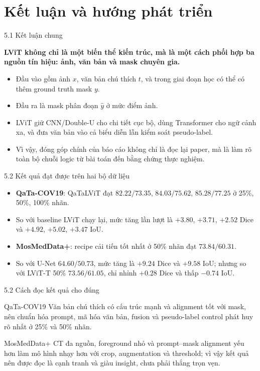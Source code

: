 \documentclass[aspectratio=169,11pt]{beamer}
\newcommand{\reportclaim}[1]{%
  \vspace{0.08cm}
  {\large\bfseries\color{accentblue}#1\par}
  \vspace{0.06cm}
}
\newcommand{\chapterdivider}[2]{%
  \begin{frame}[plain]
    \centering
    \vspace{1.2cm}
    \makebox[\textwidth][c]{%
      \begin{beamercolorbox}[wd=0.84\textwidth,rounded=true,sep=0.42cm,center]{frametitle}
        {\LARGE\bfseries #1\par}
        \vspace{0.20cm}
        {\large #2\par}
      \end{beamercolorbox}%
    }
  \end{frame}
}
\begin{document}
\section{Kết luận và hướng phát triển}
\chapterdivider{Chương 5}{Kết luận và hướng phát triển}

\begin{frame}{5.1 Kết luận chung}
  \reportclaim{LViT không chỉ là một biến thể kiến trúc, mà là một cách phối hợp ba nguồn tín hiệu: ảnh, văn bản và mask chuyên gia.}
  \begin{itemize}
    \item Đầu vào gồm ảnh \(x\), văn bản chú thích \(t\), và trong giai đoạn học có thể có thêm ground truth mask \(y\).
    \item Đầu ra là mask phân đoạn \(\hat{y}\) ở mức điểm ảnh.
    \item LViT giữ CNN/Double-U cho chi tiết cục bộ, dùng Transformer cho ngữ cảnh xa, và đưa văn bản vào cả biểu diễn lẫn kiểm soát pseudo-label.
    \item Vì vậy, đóng góp chính của báo cáo không chỉ là đọc lại paper, mà là làm rõ toàn bộ chuỗi logic từ bài toán đến bằng chứng thực nghiệm.
  \end{itemize}
\end{frame}

\begin{frame}{5.2 Kết quả đạt được trên hai bộ dữ liệu}
  \begin{itemize}
    \item \textbf{QaTa-COV19}: QaTaLViT đạt \(82.22/73.35\), \(84.03/75.62\), \(85.28/77.25\) ở 25\%, 50\%, 100\% nhãn.
    \item So với baseline LViT chạy lại, mức tăng lần lượt là \(+3.80\), \(+3.71\), \(+2.52\) Dice và \(+4.92\), \(+5.02\), \(+3.47\) IoU.
    \item \textbf{MosMedData+}: recipe cải tiến tốt nhất ở 50\% nhãn đạt \(73.84/60.31\).
    \item So với U-Net \(64.60/50.73\), mức tăng là \(+9.24\) Dice và \(+9.58\) IoU; nhưng so với LViT-T 50\% \(73.56/61.05\), chỉ nhỉnh \(+0.28\) Dice và thấp \(-0.74\) IoU.
  \end{itemize}
\end{frame}

\begin{frame}{5.2 Cách đọc kết quả cho đúng}
  \begin{block}{QaTa-COV19}
    Văn bản chú thích có cấu trúc mạnh và alignment tốt với mask, nên chuẩn hóa prompt, mã hóa văn bản, fusion và pseudo-label control phát huy rõ nhất ở 25\% và 50\% nhãn.
  \end{block}
  \begin{block}{MosMedData+}
    CT đa nguồn, foreground nhỏ và prompt--mask alignment yếu hơn làm mô hình nhạy hơn với crop, augmentation và threshold; vì vậy kết quả nên được đọc là cạnh tranh và giàu insight, chưa phải thắng trọn vẹn.
  \end{block}
\end{frame}
\end{document}
